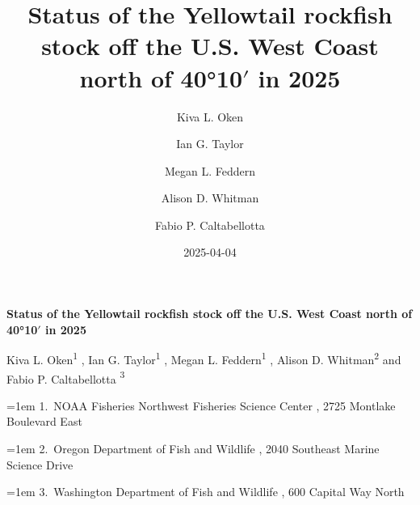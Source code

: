 \documentclass[
]{scrartcl}
\title{Status of the Yellowtail rockfish stock off the U.S. West Coast
north of 40°10\(\prime\) in 2025}
\author{Kiva L. Oken \and Ian G. Taylor \and Megan L.
Feddern \and Alison D. Whitman \and Fabio P. Caltabellotta}
\date{2025-04-04}
\begin{document}
  \begin{titlepage}

  \begin{minipage}[b][\textheight][s]{\textwidth}


  \raggedright




  {\huge\bfseries\nohyphens{Status of the Yellowtail rockfish stock off
  the U.S. West Coast north of 40°10\(\prime\) in
  2025}}\\[1\baselineskip]



  \vspace{1\baselineskip}


  \vspace{1\baselineskip}

   {\large{Kiva L. Oken}}{\textsuperscript{1}}%
  ,
   {\large{Ian G. Taylor}}{\textsuperscript{1}}%
  ,
   {\large{Megan L. Feddern}}{\textsuperscript{1}}%
  ,
   {\large{Alison D. Whitman}}{\textsuperscript{2}}%
  { and \large{Fabio P. Caltabellotta}}%
  {\textsuperscript{3}}%



  \vspace{2\baselineskip}

  \hangindent=1em
  {1}.~{NOAA Fisheries Northwest Fisheries Science Center}%
  , %
  {2725 Montlake Boulevard East}%
  \par\hangindent=1em%
  {2}.~{Oregon Department of Fish and Wildlife}%
  , %
  {2040 Southeast Marine Science Drive}%
  \par\hangindent=1em%
  {3}.~{Washington Department of Fish and Wildlife}%
  , %
  {600 Capital Way North}%



\end{minipage}
\end{titlepage}
\end{document}
